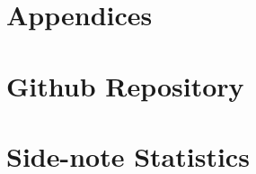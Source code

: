 \chapter*{\LARGE Appendices}

\appendix
\chapter{Github Repository}


\chapter{Side-note Statistics}

